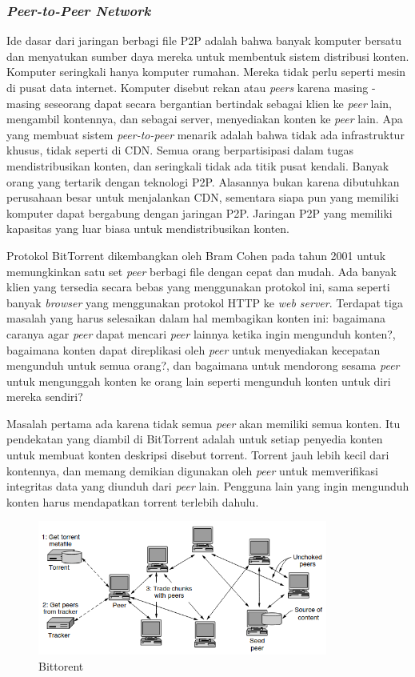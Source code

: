 \subsubsection{\emph{Peer-to-Peer Network}}

Ide dasar dari jaringan berbagi file P2P adalah bahwa banyak komputer bersatu dan menyatukan sumber daya mereka untuk membentuk sistem distribusi konten. Komputer seringkali hanya komputer rumahan. Mereka tidak perlu seperti mesin di pusat data internet. Komputer disebut rekan atau \emph{peers} karena masing - masing seseorang dapat secara bergantian bertindak sebagai klien ke \emph{peer} lain, mengambil kontennya, dan sebagai server, menyediakan konten ke \emph{peer} lain. Apa yang membuat sistem \emph{peer-to-peer} menarik adalah bahwa tidak ada infrastruktur khusus, tidak seperti di CDN. Semua orang berpartisipasi dalam tugas mendistribusikan konten, dan seringkali tidak ada titik pusat kendali. Banyak orang yang tertarik dengan teknologi P2P. Alasannya bukan karena dibutuhkan perusahaan besar untuk menjalankan CDN, sementara siapa pun yang memiliki komputer dapat bergabung dengan jaringan P2P. Jaringan P2P yang memiliki kapasitas yang luar biasa untuk mendistribusikan konten.

Protokol BitTorrent dikembangkan oleh Bram Cohen pada tahun 2001 untuk memungkinkan satu set \emph{peer} berbagi file dengan cepat dan mudah. Ada banyak klien yang tersedia secara bebas yang menggunakan protokol ini, sama seperti banyak \emph{browser} yang menggunakan protokol HTTP ke \emph{web server}. Terdapat tiga masalah yang harus selesaikan dalam hal membagikan konten ini: bagaimana caranya agar \emph{peer} dapat mencari \emph{peer} lainnya ketika ingin mengunduh konten?, bagaimana konten dapat direplikasi oleh \emph{peer} untuk menyediakan kecepatan mengunduh untuk semua orang?, dan bagaimana untuk mendorong sesama \emph{peer} untuk mengunggah konten ke orang lain seperti mengunduh konten untuk diri mereka sendiri?

Masalah pertama ada karena tidak semua \emph{peer} akan memiliki semua konten. Itu pendekatan yang diambil di BitTorrent adalah untuk setiap penyedia konten untuk membuat konten deskripsi disebut torrent. Torrent jauh lebih kecil dari kontennya, dan memang demikian digunakan oleh \emph{peer} untuk memverifikasi integritas data yang diunduh dari \emph{peer} lain. Pengguna lain yang ingin mengunduh konten harus mendapatkan torrent terlebih dahulu.

\begin{figure}[H]
  \centering{}
	\includegraphics[width=0.85\textwidth]{gambar/BitTorrent}
  \caption{Bittorent}
\end{figure}

